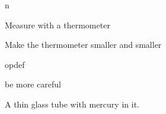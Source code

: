 \documentclass{article}
\begin{document}
n%


\begin{module}[id=thermostatics,uses=units]
\begin{observable}[name=temparature]
  \begin{opdef}Measure with a thermometer\end{opdef}
  \begin{refinement}Make the thermometer smaller and smaller\end{refinement}
\end{observable}

\begin{observable}[name=density]
  \begin{opdef}opdef\end{opdef}
  \begin{refinement}be more careful\end{refinement}
\end{observable}

\begin{system}[id=mercury-thermometer]
  \begin{realization}A thin glass tube with mercury in it.\end{realization}
\end{system}


\end{module}
\end{document}
